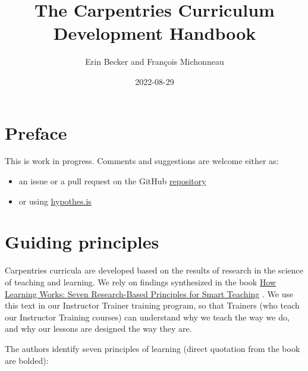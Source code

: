 \documentclass[
]{book}
\title{The Carpentries Curriculum Development Handbook}
\author{Erin Becker and François Michonneau}
\date{2022-08-29}
\providecommand{\tightlist}{%
  \setlength{\itemsep}{0pt}\setlength{\parskip}{0pt}}
\begin{document}
\maketitle

{
\setcounter{tocdepth}{1}
\tableofcontents
}
\hypertarget{preface}{%
\chapter*{Preface}\label{preface}}

This is work in progress. Comments and suggestions are welcome either as:

\begin{itemize}
\tightlist
\item
  an issue or a pull request on the GitHub \href{https://github.com/carpentries/curriculum-development}{repository}
\item
  or using \href{https://web.hypothes.is/start/}{hypothes.is}
\end{itemize}

\hypertarget{guiding-principles}{%
\chapter{Guiding principles}\label{guiding-principles}}

Carpentries curricula are developed based on the results of research in the science of
teaching and learning. We rely on findings synthesized in the book
\href{https://www.wiley.com/en-us/How+Learning+Works\%3A+Seven+Research+Based+Principles+for+Smart+Teaching-p-9780470484104}{How Learning Works: Seven Research-Based Principles for Smart Teaching} \citep{ambrose2010learning}. We use this text in our Instructor Trainer training program, so that
Trainers (who teach our Instructor Training courses) can understand why we teach the way we
do, and why our lessons are designed the way they are.

The authors identify seven principles of learning (direct quotation from the book are bolded):
\end{document}
